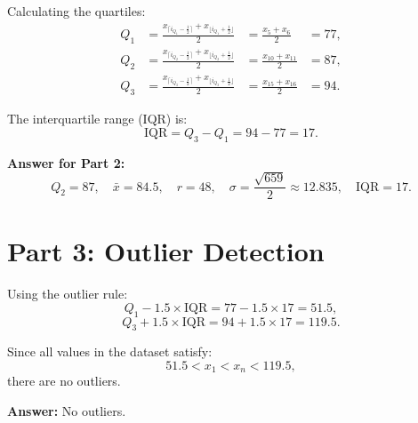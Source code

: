 \documentclass[12pt]{article}
\begin{document}
Calculating the quartiles:
\[
\begin{alignedat}{3}
Q_1 &= \frac{x_{\lceil i_{Q_1}-\frac{1}{2} \rceil} + x_{\lfloor i_{Q_1}+\frac{1}{2} \rfloor}}{2} &= \frac{x_5 + x_6}{2} &= 77, \\
Q_2 &= \frac{x_{\lceil i_{Q_2}-\frac{1}{2} \rceil} + x_{\lfloor i_{Q_2}+\frac{1}{2} \rfloor}}{2} &= \frac{x_{10} + x_{11}}{2} &= 87, \\
Q_3 &= \frac{x_{\lceil i_{Q_3}-\frac{1}{2} \rceil} + x_{\lfloor i_{Q_3}+\frac{1}{2} \rfloor}}{2} &= \frac{x_{15} + x_{16}}{2} &= 94.
\end{alignedat}
\]

The interquartile range (IQR) is:
\[
\mathrm{IQR} = Q_3 - Q_1 = 94 - 77 = 17.
\]

\textbf{Answer for Part 2:}
\[
Q_2 = 87, \quad \bar{x} = 84.5, \quad r = 48, \quad \sigma = \frac{\sqrt{659}}{2} \approx 12.835, \quad \mathrm{IQR} = 17.
\]

\bigskip

\section*{Part 3: Outlier Detection}
Using the outlier rule:
\[
Q_1 - 1.5 \times \mathrm{IQR} = 77 - 1.5 \times 17 = 51.5,
\]
\[
Q_3 + 1.5 \times \mathrm{IQR} = 94 + 1.5 \times 17 = 119.5.
\]

Since all values in the dataset satisfy:
\[
51.5 < x_1 < x_n < 119.5,
\]
there are no outliers.

\textbf{Answer:} No outliers.
\end{document}
